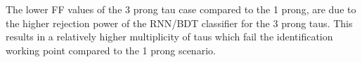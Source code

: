 	
	The lower FF values of the 3 prong tau case compared to the 1 prong, are due to the higher rejection power of the \ac{RNN}/\ac{BDT} classifier for the 3 prong taus. This results in a relatively higher multiplicity of taus which fail the identification working point compared to the 1 prong scenario. 
	
